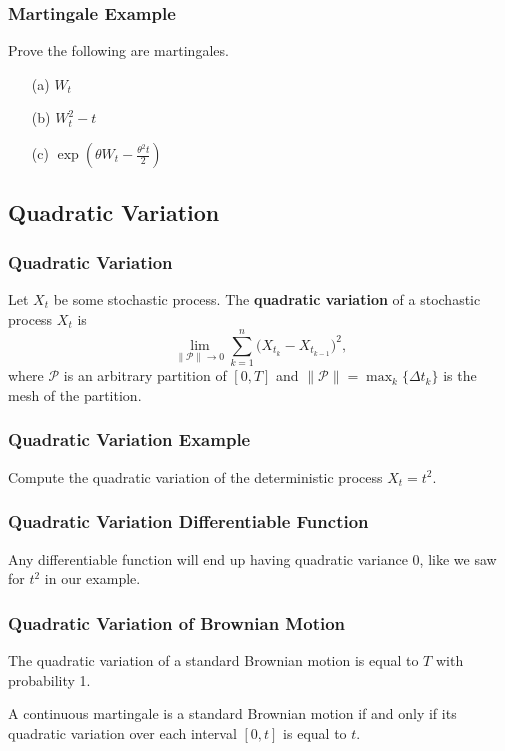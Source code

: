 \documentclass{beamer}
\begin{document}
\begin{frame}[t]
\frametitle{Martingale Example} 
\begin{Example}
Prove the following are martingales.
\begin{itemize}
\item[(a)] $W_t$
\item[(b)] $W_t^2 - t$
\item[(c)] $\exp\left(\theta W_t - \frac{\theta^2 t}{2}\right)$
\end{itemize}
\end{Example}

\end{frame}

\subsection{Quadratic Variation}

\begin{frame}
\frametitle{Quadratic Variation}
\begin{Definition}
Let $X_t$ be some stochastic process. The {\bf quadratic variation} of a stochastic process $X_t$ is
$$
\lim_{\|\mathcal{P}\|\to 0} \sum_{k = 1}^n \Big(X_{t_k} - X_{t_{k - 1}}\Big)^2,
$$
where $\mathcal{P}$ is an arbitrary partition of $[0, T]$ and $\|\mathcal{P}\| = \max_k\{\Delta t_k\}$ is the mesh of the partition.
\end{Definition}
\end{frame}

\begin{frame}[t]
\frametitle{Quadratic Variation Example}
\begin{Example}
Compute the quadratic variation of the deterministic process $X_t = t^2$.
\end{Example}

\end{frame}

\begin{frame}
\frametitle{Quadratic Variation Differentiable Function}
Any differentiable function will end up having quadratic variance 0, like we saw for $t^2$ in our example. 
\end{frame}

\begin{frame}
\frametitle{Quadratic Variation of Brownian Motion}

\begin{Theorem}
The quadratic variation of a standard Brownian motion is equal to $T$ with probability 1.
\end{Theorem}

\begin{Theorem}
 A continuous martingale is a standard Brownian motion if and only if its quadratic variation over each interval $[0, t]$ is equal to $t$.
\end{Theorem}

\end{frame}
\end{document}
